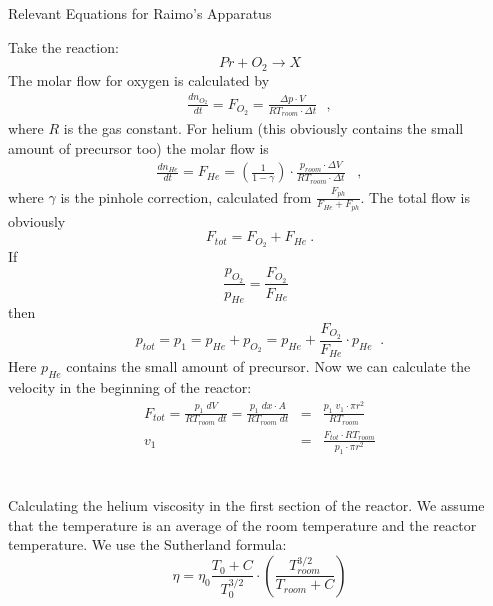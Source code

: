 \documentclass[10pt, a4paper]{article}
\begin{document}
\begin{center}
\begin{huge}
Relevant Equations for Raimo's Apparatus
\end{huge}
\end{center}
Take the reaction: 
\begin{equation*}
Pr + O_2 \rightarrow X
\end{equation*}
The molar flow for oxygen is calculated by 
\begin{eqnarray*}
\frac{dn_{O_2}}{dt} = F_{O_2} = \frac{\Delta p \cdot V}{RT_{room} \cdot \Delta t} \:\:\:, 
\end{eqnarray*}
where $R$ is the gas constant. For helium (this obviously contains the small amount of precursor too) the molar flow is 
\begin{eqnarray*}
\frac{dn_{He}}{dt} = F_{He} = \left( \frac{1}{1 - \gamma} \right) \cdot \frac{p_{room} \cdot \Delta V}{RT_{room} \cdot \Delta t} \;\;\;,
\end{eqnarray*}
where $\gamma$ is the pinhole correction, calculated from $ \frac{F_{ph}}{F_{He} + F_{ph}} $. The total flow is obviously 
\begin{equation*}
F_{tot} = F_{O_2} + F_{He} \:.
\end{equation*}
If 
\begin{equation*}
\frac{p_{O_2}}{p_{He}} =  \frac{F_{O_2}}{F_{He}} \;\;
\end{equation*}
then 
\begin{equation*}
p_{tot} = p_1 = p_{He} + p_{O_2} =  p_{He} + \frac{F_{O_2}}{F_{He}} \cdot p_{He} \;\;.
\end{equation*}
Here $p_{He}$ contains the small amount of precursor. Now we can calculate the velocity in the beginning of the reactor: 
\begin{eqnarray*}
F_{tot} = \frac{p_1\;dV}{RT_{room}\;dt} = \frac{p_1\; dx \cdot A}{RT_{room}\;dt} &=& \frac{p_1\; v_1 \cdot \pi r^2}{RT_{room}} \\
v_1 &=& \frac{F_{tot} \cdot RT_{room}}{p_1 \cdot \pi r^2}
\end{eqnarray*}
\\
\\
Calculating the helium viscosity in the first section of the reactor. We assume that the temperature is an average of the room temperature and the reactor temperature. We use the Sutherland formula: 
\begin{equation*}
\eta = \eta_0 \frac{T_0 + C}{T_0^{3/2}} \cdot \left( \frac{T_{room}^{3/2}}{T_{room} + C} \right) 
\end{equation*}
\end{document}

